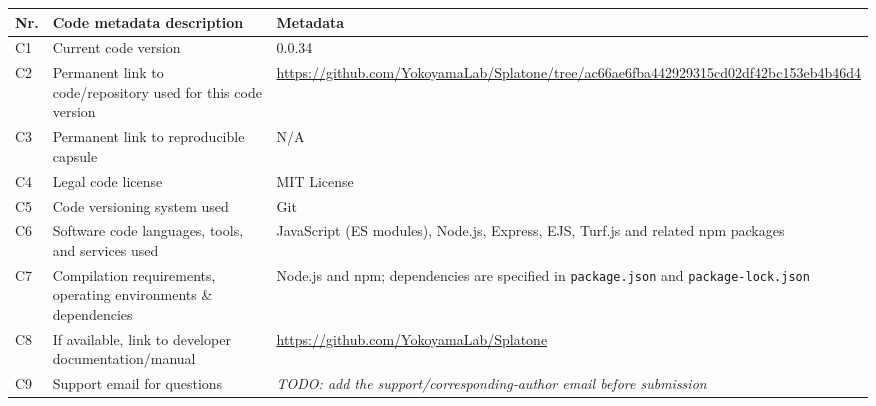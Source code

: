 \documentclass[preprint,12pt]{elsarticle}
\begin{document}
\renewcommand{\arraystretch}{1.2}
\begin{tabularx}{\textwidth}{>{\raggedright\arraybackslash}p{} >{\raggedright\arraybackslash}p{} X}
\toprule
Nr. & Code metadata description & Metadata \\
\midrule
C1 & Current code version & 0.0.34 \\
C2 & Permanent link to code/repository used for this code version & \url{https://github.com/YokoyamaLab/Splatone/tree/ac66ae6fba442929315cd02df42bc153eb4b46d4} \\
C3 & Permanent link to reproducible capsule & N/A \\
C4 & Legal code license & MIT License \\
C5 & Code versioning system used & Git \\
C6 & Software code languages, tools, and services used & JavaScript (ES modules), Node.js, Express, EJS, Turf.js and related npm packages \\
C7 & Compilation requirements, operating environments \& dependencies & Node.js and npm; dependencies are specified in \texttt{package.json} and \texttt{package-lock.json} \\
C8 & If available, link to developer documentation/manual & \url{https://github.com/YokoyamaLab/Splatone} \\
C9 & Support email for questions & \textit{TODO: add the support/corresponding-author email before submission} \\
\bottomrule
\end{tabularx}

\vspace{1em}





\end{document}
